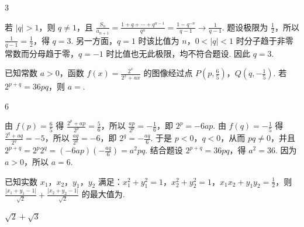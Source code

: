 \begin{answer}
3
\end{answer}

\begin{solution}
若 \(\lvert q\rvert>1\)，则 \(q\ne1\)，且
\(\frac{S_n}{a_{n+1}}=\frac{1+q+\cdots+q^{n-1}}{q^n}=\frac{1-q^{-n}}{q-1}\to\frac1{q-1}\). 题设极限为 \(\frac12\)，所以 \(\frac1{q-1}=\frac12\)，得 \(q=3\). 另一方面，\(q=1\) 时该比值为 \(n\)，\(0<\lvert q\rvert<1\) 时分子趋于非零常数而分母趋于零，\(q=-1\) 时比值也无此极限，均不符合题设. 因此 \(q=3\).
\end{solution}

\begin{problem}
已知常数 \(a>0\)，函数 \(f(x)=\frac{2^x}{2^x+ax}\) 的图像经过点 \(P\left(p,\frac65\right)\)，\(Q\left(q,-\frac15\right)\). 若 \(2^{p+q}=36pq\)，则 \(a=\)\fillinblank{}.
\end{problem}

\begin{answer}
6
\end{answer}

\begin{solution}
由 \(f(p)=\frac65\) 得 \(\frac{2^p+ap}{2^p}=\frac56\)，所以 \(\frac{ap}{2^p}=-\frac16\)，即 \(2^p=-6ap\). 由 \(f(q)=-\frac15\) 得 \(\frac{2^q+aq}{2^q}=-5\)，所以 \(\frac{aq}{2^q}=-6\)，即 \(2^q=-\frac{aq}{6}\). 于是 \(p<0\)，\(q<0\)，从而 \(pq\ne0\)，并且
\(2^{p+q}=2^p2^q=(-6ap)\left(-\frac{aq}{6}\right)=a^2pq\). 结合题设 \(2^{p+q}=36pq\)，得 \(a^2=36\). 因为 \(a>0\)，所以 \(a=6\).
\end{solution}

\begin{problem}
已知实数 \(x_1\)，\(x_2\)，\(y_1\)，\(y_2\) 满足：\(x_1^2+y_1^2=1\)，\(x_2^2+y_2^2=1\)，\(x_1x_2+y_1y_2=\frac12\)，则 \(\frac{\lvert x_1+y_1-1\rvert}{\sqrt2}+\frac{\lvert x_2+y_2-1\rvert}{\sqrt2}\) 的最大值为\fillinblank{}.
\end{problem}

\begin{answer}
\(\sqrt2+\sqrt3\)
\end{answer}

